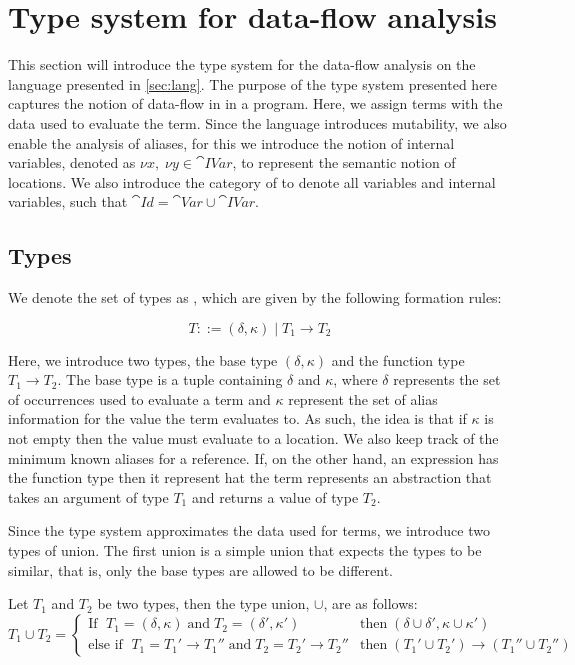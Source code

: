 \documentclass[../../master.tex]{subfiles}
\begin{document}
\section{Type system for data-flow analysis}
This section will introduce the type system for the data-flow analysis on the language presented in \cref{sec:lang}.
The purpose of the type system presented here captures the notion of data-flow in in a program.
Here, we assign terms with the data used to evaluate the term.
Since the language introduces mutability, we also enable the analysis of aliases, for this we introduce the notion of internal variables, denoted as $\nu x,\; \nu y\in\cat{IVar}$, to represent the semantic notion of locations.
We also introduce the category of  to denote all variables and internal variables, such that $\cat{Id}=\cat{Var}\cup\cat{IVar}$.

\subsection{Types}
We denote the set of types as , which are given by the following formation rules:

$$T::=(\delta,\kappa)\mid T_1 \rightarrow T_2$$

Here, we introduce two types, the base type $(\delta,\kappa)$ and the function type $T_1 \rightarrow T_2$.
The base type is a tuple containing $\delta$ and $\kappa$, where $\delta$ represents the set of occurrences used to evaluate a term and $\kappa$ represent the set of alias information for the value the term evaluates to.
As such, the idea is that if $\kappa$ is not empty then the value must evaluate to a location.
We also keep track of the minimum known aliases for a reference.
If, on the other hand, an expression has the function type then it represent hat the term represents an abstraction that takes an argument of type $T_1$ and returns a value of type $T_2$.

Since the type system approximates the data used for terms, we introduce two types of union.
The first union is a simple union that expects the types to be similar, that is, only the base types are allowed to be different.
\begin{definition}
	Let $T_1$ and $T_2$ be two types, then the type union, $\cup$, are as follows:
	\begin{equation*}
		T_1\cup T_2=
		\left\{\begin{matrix}
			\mbox{If } \; T_1=(\delta,\kappa) \;\mbox{and}\; T_2=(\delta',\kappa')  & \mbox{then} \; (\delta\cup\delta',\kappa\cup\kappa')\\
			\mbox{else if } \; T_1=T_1'\rightarrow T_1''\;\mbox{and}\;T_2=T_2'\rightarrow T_2'' & \mbox{then} \; (T_1'\cup T_2')\rightarrow (T_1''\cup T_2'')
		\end{matrix}\right.
	\end{equation*}
\end{definition}
\end{document}
